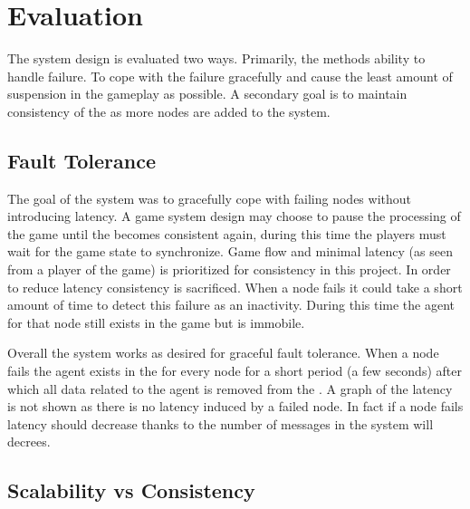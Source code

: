 

\section{Evaluation}
\label{sec:evaluation}

The system design is evaluated two ways. Primarily, the methods ability to handle failure. To cope with the failure gracefully and cause the least amount of suspension in the gameplay as possible. A secondary goal is to maintain consistency of the \gamestate as more nodes are added to the system.

\subsection{Fault Tolerance}

The goal of the system was to gracefully cope with failing nodes without introducing latency. 
A game system design may choose to pause the processing of the game until the \gamestate becomes consistent again, during this time the players must wait for the game state to synchronize.
Game flow and minimal latency (as seen from a player of the game) is prioritized for consistency in this project.
In order to reduce latency consistency is sacrificed. 
When a node fails it could take a short amount of time to detect this failure as an inactivity.
During this time the agent for that node still exists in the game but is immobile.

Overall the system works as desired for graceful fault tolerance.
When a node fails the agent exists in the \gamestate for every node for a short period (a few seconds) after which all data related to the agent is removed from the \gamestate.
A graph of the latency is not shown as there is no latency induced by a failed node.
In fact if a node fails latency should decrease thanks to the number of messages in the system will decrees.

\subsection{Scalability vs Consistency}

